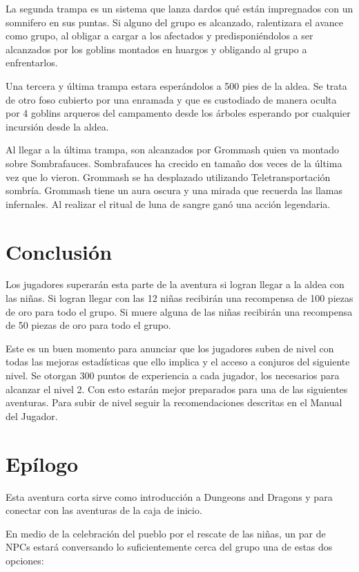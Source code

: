 \documentclass[10pt,twoside,twocolumn,openany]{dndbook}
\begin{document}
La segunda trampa es un sistema que lanza dardos qué están impregnados con un somnifero en sus puntas. 
Si alguno del grupo es alcanzado, ralentizara el avance como grupo, al obligar a cargar a los afectados 
y predisponiéndolos a ser alcanzados por los goblins montados en huargos y obligando al grupo a 
enfrentarlos.

Una tercera y última trampa estara esperándolos a 500 pies de la aldea. Se trata de otro foso cubierto
por una enramada y que es custodiado de manera oculta por 4 goblins arqueros del campamento desde los 
árboles esperando por cualquier incursión desde la aldea. 

Al llegar a la última trampa, son alcanzados por Grommash quien va montado sobre Sombrafauces.
Sombrafauces ha crecido en tamaño dos veces de la última vez que lo vieron. Grommash se ha desplazado
utilizando Teletransportación sombría. Grommash tiene un aura oscura y una mirada que recuerda las llamas 
infernales. Al realizar el ritual de luna de sangre ganó una acción legendaria.

\section{Conclusión}

Los jugadores superarán esta parte de la aventura si logran llegar a la aldea con las niñas. Si 
logran llegar con las 12 niñas recibirán una recompensa de 100 piezas de oro para todo el grupo. Si
muere alguna de las niñas recibirán una recompensa de 50 piezas de oro para todo el grupo.

Este es un buen momento para anunciar que los jugadores suben de nivel con todas las mejoras 
estadísticas que ello implica y el acceso a conjuros del siguiente nivel. Se otorgan 300 puntos 
de experiencia a cada jugador, los necesarios para alcanzar el nivel 2. Con esto estarán mejor 
preparados para una de las siguientes aventuras. Para subir de nivel seguir la recomendaciones
descritas en el Manual del Jugador.

\section{Epílogo}

Esta aventura corta sirve como introducción a Dungeons and Dragons y para conectar con las 
aventuras de la caja de inicio.

En medio de la celebración del pueblo por el rescate de las niñas, un par de NPCs estará conversando
lo suficientemente cerca del grupo una de estas dos opciones:
\end{document}
